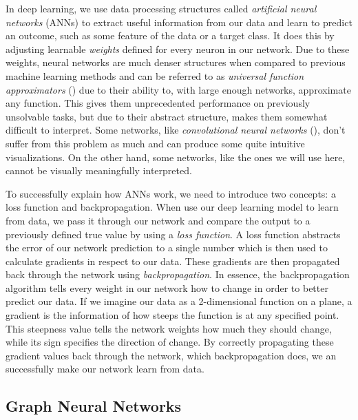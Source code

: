 \documentclass[times, utf8, diplomski, english]{fer_eng}
\begin{document}
In deep learning, we use data processing structures called \textit{artificial neural networks} (ANNs) to extract useful information from our data and learn to predict an outcome, such as some feature of the data or a target class. It does this by adjusting learnable \textit{weights} defined for every neuron in our network. Due to these weights, neural networks are much denser structures when compared to previous machine learning methods and can be referred to as \textit{universal function approximators} (\cite{uni_approx}) due to their ability to, with large enough networks, approximate any function. This gives them unprecedented performance on previously unsolvable tasks, but due to their abstract structure, makes them somewhat difficult to interpret. Some networks, like \textit{convolutional neural networks} (\cite{CNN}), don't suffer from this problem as much and can produce some quite intuitive visualizations. On the other hand, some networks, like the ones we will use here, cannot be visually meaningfully interpreted.

To successfully explain how ANNs work, we need to introduce two concepts: a loss function and backpropagation. When use our deep learning model to learn from data, we pass it through our network and compare the output to a previously defined true value by using a \textit{loss function}. A loss function abstracts the error of our network prediction to a single number which is then used to calculate gradients in respect to our data. These gradients are then propagated back through the network using \textit{backpropagation}. In essence, the backpropagation algorithm tells every weight in our network how to change in order to better predict our data. If we imagine our data as a 2-dimensional function on a plane, a gradient is the information of how steeps the function is at any specified point. This steepness value tells the network weights how much they should change, while its sign specifies the direction of change. By correctly propagating these gradient values back through the network, which backpropagation does, we an successfully make our network learn from data.

\subsection{Graph Neural Networks}
\end{document}
